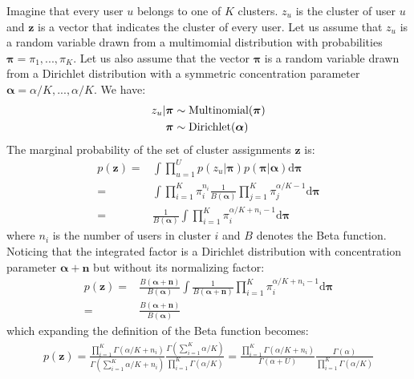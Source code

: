 \documentclass[smallextended]{svjour3}          %
\begin{document}
Imagine that every user $u$ belongs to one of $K$ clusters. $z_u$ is the cluster of user $u$ and $\mathbf{z}$ is a vector that indicates the cluster of every user. Let us assume that $z_u$ is a random variable drawn from a multimomial distribution with probabilities $\boldsymbol{\pi}= \pi_1,...,\pi_K$. Let us also assume that the vector $\boldsymbol{\pi}$ is a random variable drawn from a Dirichlet distribution with a symmetric concentration parameter $\boldsymbol{\alpha} = \alpha/K,...,\alpha/K$. We have: 
\begin{align*}
z_u | \boldsymbol{\pi} &\sim \text{Multinomial}(\boldsymbol{\pi})\notag\\
\boldsymbol{\pi} &\sim \text{Dirichlet}(\boldsymbol{\alpha})
\end{align*}
The marginal probability of the set of cluster assignments $\mathbf{z}$ is:
\begin{align*}
p(\mathbf{z}) =& 
\int \prod_{u=1}^U p(z_u | \boldsymbol{\pi})p(\boldsymbol{\pi} | \boldsymbol{\alpha})
\text{d}\boldsymbol{\pi}\\
=&\int 
   \prod_{i=1}^K \pi_i^{n_i} 
   \frac{1}{B(\boldsymbol{\alpha})}
   \prod_{j=1}^K \pi_j^{\alpha/K-1}
   \text{d}\boldsymbol{\pi}\\
=&
\frac{1}{B(\boldsymbol{\alpha})}
\int 
   \prod_{i=1}^K \pi_i^{\alpha/K + n_i - 1}
   \text{d}\boldsymbol{\pi}
\end{align*}
where $n_i$ is the number of users in cluster $i$ and $B$ denotes the Beta function. Noticing that the integrated factor is a Dirichlet distribution with concentration parameter $\boldsymbol{\alpha} + \mathbf{n}$ but without its normalizing factor:
\begin{align*}
p(\mathbf{z})=&
\frac{
B(\boldsymbol{\alpha} + \mathbf{n})
}{
B(\boldsymbol{\alpha})
}%
\int 
   \frac{1}{
   B(\boldsymbol{\alpha + \mathbf{n}})
   }
   \prod_{i=1}^K \pi_i^{\alpha/K + n_i - 1}
   \text{d}\boldsymbol{\pi}\\
=& 
\frac{
B(\boldsymbol{\alpha} + \mathbf{n})
}{
B(\boldsymbol{\alpha})
}
\end{align*}
which expanding the definition of the Beta function becomes:
\begin{align}
p(\mathbf{z})=
\frac{
\prod_{i=1}^K \Gamma(\alpha/K + n_i)
}
{
\Gamma \left(\sum_{i=1}^K \alpha/K + n_i \right)
}
\frac{
\Gamma \left(\sum_{i=1}^K \alpha/K \right)
}
{
\prod_{i=1}^K \Gamma(\alpha/K)
}
= 
\frac{
	\prod_{i=1}^K \Gamma(\alpha/K + n_i)
}
{
	\Gamma \left(\alpha + U \right)
}
\frac{
	\Gamma \left(\alpha \right)
}
{
	\prod_{i=1}^K \Gamma(\alpha/K)
}
\label{eq:p_z}
\end{align}
\end{document}
